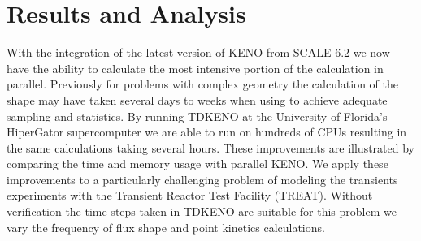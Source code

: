 \documentclass{anstrans}
\renewcommand{\vec}[1]{\bm{#1}} %
\newcommand{\vd}{\bm{\cdot}} %
\newcommand{\grad}{\vec{\nabla}} %
\newcommand{\ud}{\mathop{}\!\mathrm{d}} %
\begin{document}

\section{Results and Analysis}
With the integration of the latest version of KENO from SCALE 6.2 we now have the ability to calculate the most intensive portion of the calculation in parallel.  Previously for problems with complex geometry the calculation of the shape may have taken several days to weeks when using to achieve adequate sampling and statistics.  By running TDKENO at the University of Florida's HiperGator supercomputer we are able to run on hundreds of CPUs resulting in the same calculations taking several hours.  These improvements are illustrated by comparing the time and memory usage with parallel KENO.  We apply these improvements to a particularly challenging problem of modeling the transients experiments with the Transient Reactor Test Facility (TREAT).  Without verification the time steps taken in TDKENO are suitable for this problem we vary the frequency of flux shape and point kinetics calculations.
\end{document}
